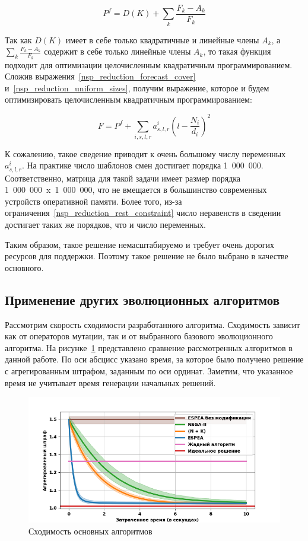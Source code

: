 \documentclass[times,specification,annotation]{itmo-student-thesis}
\begin{document}
\begin{equation} P^f = D(K) + \sum\limits_{k} \frac{F_k - A_k}{F_k} \label{nsp_reduction_forecast_cover}\end{equation}

Так как $D(K)$ имеет в себе только квадратичные и линейные члены $A_k$, а $\sum\limits_{k} \frac{F_k - A_k}{F_k}$ содержит в себе только линейные члены $A_k$, то такая функция подходит для оптимизации целочисленным квадратичным программированием.
Сложив выражения~\eqref{nsp_reduction_forecast_cover} и~\eqref{nsp_reduction_uniform_sizes}, получим выражение, которое и будем оптимизировать целочисленным квадратичным программированием:

\begin{equation} F = P^f + \sum\limits_{i, s, l, r} a^i_{s, l, r} \left( l - \frac{N_i}{d_i} \right)^2 \end{equation}

К сожалению, такое сведение приводит к очень большому числу переменных $a^i_{s, l, r}$.
На практике число шаблонов смен достигает порядка 1~000~000.
Соответственно, матрица для такой задачи имеет размер порядка 1~000~000~x~1~000~000, что не вмещается в большинство современных устройств оперативной памяти.
Более того, из-за ограничения~\eqref{nsp_reduction_rest_constraint} число неравенств в сведении достигает таких же порядков, что и число переменных.

Таким образом, такое решение немасштабируемо и требует очень дорогих ресурсов для поддержки.
Поэтому такое решение не было выбрано в качестве основного.

\subsection{Применение других эволюционных алгоритмов}

Рассмотрим скорость сходимости разработанного алгоритма.
Сходимость зависит как от операторов мутации, так и от выбранного базового эволюционного алгоритма.
На рисунке~\ref{fig2:convergency_core_algorithms} представлено сравнение рассмотренных алгоритмов в данной работе.
По оси абсцисс указано время, за которое было получено решение с агрегированным штрафом, заданным по оси ординат.
Заметим, что указанное время не учитывает время генерации начальных решений.

\begin{figure}
\caption{Сходимость основных алгоритмов}\label{fig2:convergency_core_algorithms}
\centering
\includegraphics[width=1\columnwidth]{core_algorithms_convergency.png}
\end{figure}
\end{document}
